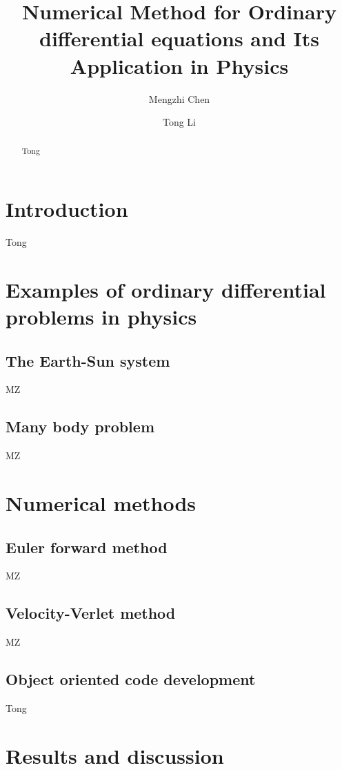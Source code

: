 \documentclass{article}
\title{Numerical Method for Ordinary differential equations and Its Application in Physics}
\author[1]{Mengzhi Chen}
\author[1]{Tong Li}
\affil[1]{Department of Physics and Astronomy, Michigan State University}
\date{}
\begin{document}
	\maketitle
	\begin{abstract}\label{abstract}
Tong
	\end{abstract}

\section{Introduction}\label{intro} 
	Tong
	
\section{Examples of ordinary differential problems in physics}\label{physcis_problem}
	
	\subsection{The Earth-Sun system}\label{earthsun}
	MZ

	\subsection{Many body problem}\label{quantumdot}
	MZ

\section{Numerical methods}\label{method}
  
	\subsection{Euler forward method}\label{euler}
	MZ
	
	\subsection{Velocity-Verlet method} \label{verlet}
	MZ
	
	\subsection{Object oriented code development}\label{obj}
	Tong
	
\section{Results and discussion}\label{results}
\end{document}

